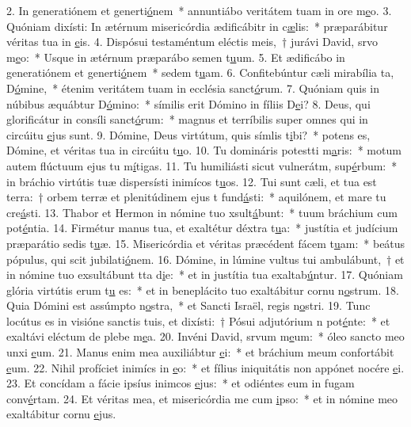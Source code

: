 2. In generatiónem et generti\uline{ó}nem~* annuntiábo veritátem tuam in ore m\uline{e}o.
3. Quóniam dixísti: In ætérnum misericórdia ædificábitr in c\uline{æ}lis:~* præparábitur véritas tua in \uline{e}is.
4. Dispósui testaméntum eléctis meis,~† jurávi David, srvo m\uline{e}o:~* Usque in ætérnum præparábo semen t\uline{u}um.
5. Et ædificábo in generatiónem et generti\uline{ó}nem~* sedem t\uline{u}am.
6. Confitebúntur cæli mirabília ta, D\uline{ó}mine,~* étenim veritátem tuam in ecclésia sanct\uline{ó}rum.
7. Quóniam quis in núbibus æquábtur D\uline{ó}mino:~* símilis erit Dómino in fíliis D\uline{e}i?
8. Deus, qui glorificátur in consíli sanct\uline{ó}rum:~* magnus et terríbilis super omnes qui in circúitu \uline{e}jus sunt.
9. Dómine, Deus virtútum, quis símlis t\uline{i}bi?~* potens es, Dómine, et véritas tua in circúitu t\uline{u}o.
10. Tu domináris potestti m\uline{a}ris:~* motum autem flúctuum ejus tu m\uline{í}tigas.
11. Tu humiliásti sicut vulnerátm, sup\uline{é}rbum:~* in bráchio virtútis tuæ dispersísti inimícos t\uline{u}os.
12. Tui sunt cæli, et tua est terra:~† orbem terræ et plenitúdinem ejus t fund\uline{á}sti:~* aquilónem, et mare tu cre\uline{á}sti.
13. Thabor et Hermon in nómine tuo xsult\uline{á}bunt:~* tuum bráchium cum pot\uline{é}ntia.
14. Firmétur manus tua, et exaltétur déxtra t\uline{u}a:~* justítia et judícium præparátio sedis t\uline{u}æ.
15. Misericórdia et véritas præcédent fácem t\uline{u}am:~* beátus pópulus, qui scit jubilati\uline{ó}nem.
16. Dómine, in lúmine vultus tui ambulábunt,~† et in nómine tuo exsultábunt tta d\uline{i}e:~* et in justítia tua exaltab\uline{ú}ntur.
17. Quóniam glória virtútis erum t\uline{u} es:~* et in beneplácito tuo exaltábitur cornu n\uline{o}strum.
18. Quia Dómini est assúmpto n\uline{o}stra,~* et Sancti Israël, regis n\uline{o}stri.
19. Tunc locútus es in visióne sanctis tuis, et dixísti:~† Pósui adjutórium n pot\uline{é}nte:~* et exaltávi eléctum de plebe m\uline{e}a.
20. Invéni David, srvum m\uline{e}um:~* óleo sancto meo unxi \uline{e}um.
21. Manus enim mea auxiliábtur \uline{e}i:~* et bráchium meum confortábit \uline{e}um.
22. Nihil profíciet inimícs in \uline{e}o:~* et fílius iniquitátis non appónet nocére \uline{e}i.
23. Et concídam a fácie ipsíus inimcos \uline{e}jus:~* et odiéntes eum in fugam conv\uline{é}rtam.
24. Et véritas mea, et misericórdia me cum \uline{i}pso:~* et in nómine meo exaltábitur cornu \uline{e}jus.
